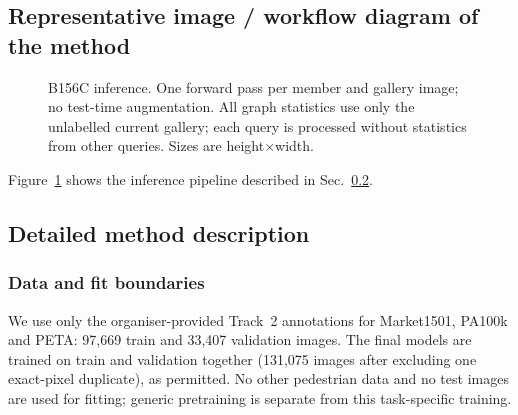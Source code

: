 \documentclass[a4paper, 10pt, conference]{ieeeconf}
\begin{document}
\subsection{Representative image / workflow diagram of the method}
\begin{figure}[t]
\centering
{}
\caption{B156C inference. One forward pass per member and gallery image; no test-time augmentation. All graph statistics use only the unlabelled current gallery; each query is processed without statistics from other queries. Sizes are height$\times$width.}
\label{fig:workflow}
\end{figure}
Figure~\ref{fig:workflow} shows the inference pipeline described in Sec.~\ref{sec:method}.

\subsection{Detailed method description}\label{sec:method}
\subsubsection{Data and fit boundaries}
We use only the organiser-provided Track~2 annotations for Market1501, PA100k and PETA: 97{,}669 train and 33{,}407 validation images. The final models are trained on train and validation together (131{,}075 images after excluding one exact-pixel duplicate), as permitted. No other pedestrian data and no test images are used for fitting; generic pretraining is separate from this task-specific training.
\end{document}
